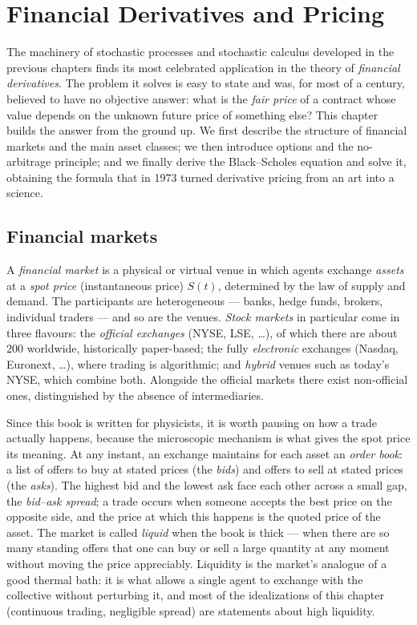 
\chapter{Financial Derivatives and Pricing}

The machinery of stochastic processes and stochastic calculus developed in the previous chapters finds its most celebrated application in the theory of \emph{financial derivatives}.
The problem it solves is easy to state and was, for most of a century, believed to have no objective answer: what is the \emph{fair price} of a contract whose value depends on the unknown future price of something else?
This chapter builds the answer from the ground up.
We first describe the structure of financial markets and the main asset classes; we then introduce options and the no-arbitrage principle; and we finally derive the Black--Scholes equation and solve it, obtaining the formula that in 1973 turned derivative pricing from an art into a science.


\section{Financial markets}

A \emph{financial market} is a physical or virtual venue in which agents exchange \emph{assets} at a \emph{spot price} (instantaneous price) $S(t)$, determined by the law of supply and demand.
The participants are heterogeneous --- banks, hedge funds, brokers, individual traders --- and so are the venues.
\emph{Stock markets} in particular come in three flavours: the \emph{official exchanges} (NYSE, LSE, \ldots), of which there are about $200$ worldwide, historically paper-based; the fully \emph{electronic} exchanges (Nasdaq, Euronext, \ldots), where trading is algorithmic; and \emph{hybrid} venues such as today's NYSE, which combine both.
Alongside the official markets there exist non-official ones, distinguished by the absence of intermediaries.

Since this book is written for physicists, it is worth pausing on how a trade actually happens, because the microscopic mechanism is what gives the spot price its meaning.
At any instant, an exchange maintains for each asset an \emph{order book}: a list of offers to buy at stated prices (the \emph{bids}) and offers to sell at stated prices (the \emph{asks}).
The highest bid and the lowest ask face each other across a small gap, the \emph{bid--ask spread}; a trade occurs when someone accepts the best price on the opposite side, and the price at which this happens is the quoted price of the asset.
The market is called \emph{liquid} when the book is thick --- when there are so many standing offers that one can buy or sell a large quantity at any moment without moving the price appreciably.
Liquidity is the market's analogue of a good thermal bath: it is what allows a single agent to exchange with the collective without perturbing it, and most of the idealizations of this chapter (continuous trading, negligible spread) are statements about high liquidity.


